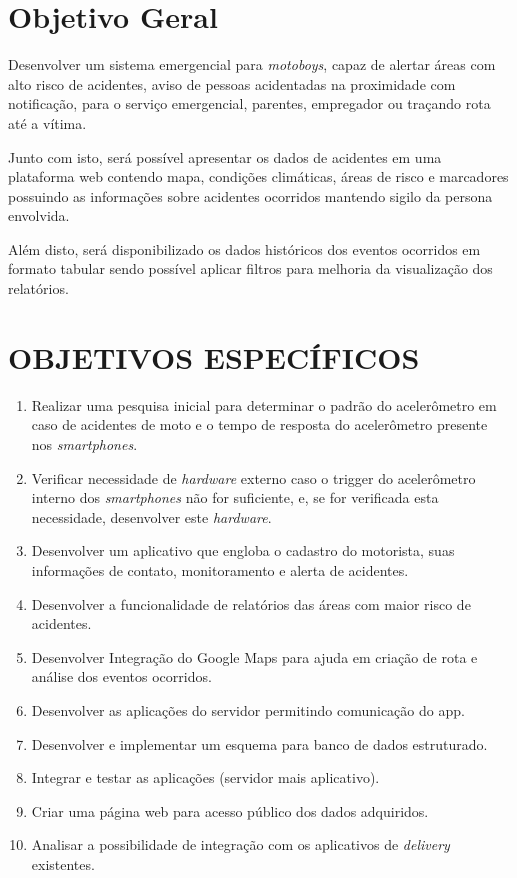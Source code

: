 \section{Objetivo Geral}


Desenvolver um sistema emergencial para \textit{motoboys}, capaz de alertar áreas com alto risco de acidentes, aviso de pessoas acidentadas na proximidade com notificação, para o serviço emergencial, parentes, empregador ou traçando rota até a vítima.

Junto com isto, será possível apresentar os dados de acidentes em uma plataforma web contendo mapa, condições climáticas, áreas de risco e marcadores possuindo as informações sobre acidentes ocorridos mantendo sigilo da persona envolvida.

Além disto, será disponibilizado os dados históricos dos eventos ocorridos em formato tabular sendo possível aplicar filtros para melhoria da visualização dos relatórios.





\section{OBJETIVOS ESPECÍFICOS}

\begin{enumerate}
    \item Realizar uma pesquisa inicial para determinar o padrão do acelerômetro em caso de acidentes de moto e o tempo de resposta do acelerômetro presente nos \textit{smartphones}.
\item Verificar necessidade de \textit{hardware} externo caso o trigger do acelerômetro interno dos \textit{smartphones} não for suficiente, e, se for verificada esta necessidade, desenvolver este \textit{hardware}.
\item 	Desenvolver um aplicativo que engloba o cadastro do motorista, suas informações de contato, monitoramento e alerta de acidentes.
\item 	Desenvolver a funcionalidade de relatórios das áreas com maior risco de acidentes.
\item 	Desenvolver Integração do Google Maps para ajuda em criação de rota e análise dos eventos ocorridos.
\item 	Desenvolver as aplicações do servidor permitindo comunicação do app.
\item 	Desenvolver e implementar um esquema para banco de dados estruturado.
\item 	Integrar e testar as aplicações (servidor mais aplicativo).
\item 	Criar uma página web para acesso público dos dados adquiridos.
\item 	Analisar a possibilidade de integração com os aplicativos de \textit{delivery} existentes.

\end{enumerate}

